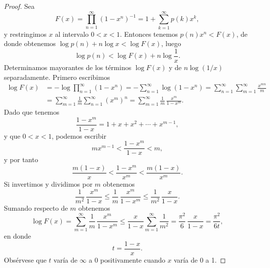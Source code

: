     \begin{proof}
        Sea
        \begin{equation*}
            F(x)=\prod_{n=1}^{\infty}(1-x^n)^{-1}=1+\sum_{k=1}^{\infty}p(k)x^k,
        \end{equation*}
        y restringimos $x$ al intervalo $0<x<1$. Entonces tenemos $p(n)x^n<F(x)$, de donde
        obtenemos $\log p(n)+n\log x<\log F(x)$, luego
        \begin{equation}\label{eq:14-9}
            \log p(n)<\log F(x)+n\log\frac{1}{x}.
        \end{equation}
        Determinamos mayorantes de los términos $\log F(x)$ y de $n\log(1/x)$ separadamente.
        Primero escribimos
        \begin{align*}
            \log F(x)&=-\log\prod_{n=1}^{\infty}(1-x^n)=-\sum_{n=1}^{\infty}\log(1-x^n)=\sum_{n=1}^{\infty}\sum_{m=1}^{\infty}\frac{x^{mn}}{m}\\
            &=\sum_{m=1}^{\infty}\frac{1}{m}\sum_{n=1}^{\infty}(x^m)^n=\sum_{m=1}^{\infty}\frac{1}{m}\,\frac{x^m}{1-x^m}.
        \end{align*}
        Dado que tenemos
        \begin{equation*}
            \frac{1-x^m}{1-x}=1+x+x^2+\cdots+x^{m-1},
        \end{equation*}
        y que $0<x<1$, podemos escribir
        \begin{equation*}
            mx^{m-1}<\frac{1-x^m}{1-x}<m,
        \end{equation*}
        y por tanto
        \begin{equation*}
            \frac{m(1-x)}{x}<\frac{1-x^m}{x^m}<\frac{m(1-x)}{x^m}.
        \end{equation*}
        Si invertimos y dividimos por $m$ obtenemos
        \begin{equation*}
            \frac{1}{m^2}\,\frac{x^m}{1-x}\leq\frac{1}{m}\,\frac{x^m}{1-x^m}\leq\frac{1}{m^2}\,\frac{x}{1-x}.
        \end{equation*}
        Sumando respecto de $m$ obtenemos
        \begin{equation*}
            \log F(x)=\sum_{m=1}^{\infty}\frac{1}{m}\,\frac{x^m}{1-x^m}\leq\frac{x}{1-x}\sum_{m=1}^{\infty}\frac{1}{m^2}=\frac{\pi^2}{6}\,\frac{x}{1-x}=\frac{\pi^2}{6t},
        \end{equation*}
        en donde
        \begin{equation*}
            t=\frac{1-x}{x}.
        \end{equation*}
        Obsérvese que $t$ varía de $\infty$ a 0 positivamente cuando $x$ varía de 0 a 1.


\end{proof}
